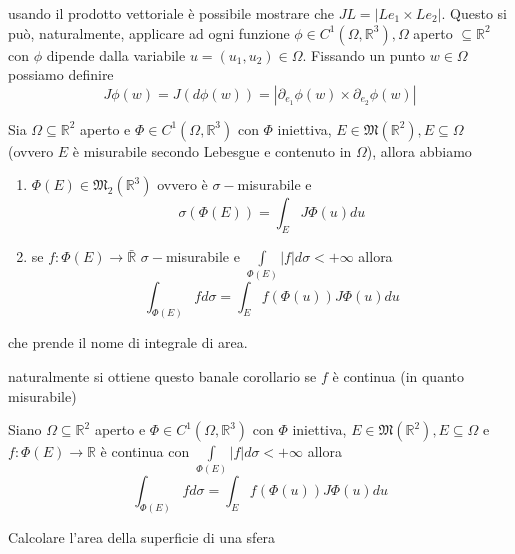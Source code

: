 usando il prodotto vettoriale è possibile mostrare che $JL = |Le_1 \times Le_2|$. Questo si può, naturalmente, applicare ad ogni funzione $\phi \in C^1(\Omega, \mathbb{R}^3), \Omega$ aperto $\subseteq \mathbb{R}^2$ con $\phi$ dipende dalla variabile $u = (u_1, u_2) \in \Omega$. Fissando un punto $w \in \Omega$ possiamo definire
$$
J\phi(w) = J(d\phi(w)) = |\partial_{e_1} \phi(w) \times \partial_{e_2} \phi(w)|
$$
\begin{theorem}[H2]
	Sia $\Omega \subseteq \mathbb{R}^2$ aperto e $\Phi \in C^1(\Omega, \mathbb{R}^3)$ con $\Phi$ iniettiva, $E \in \mathfrak{M}(\mathbb{R}^2), E \subseteq \Omega$ (ovvero $E$ è misurabile secondo Lebesgue e contenuto in $\Omega$), allora abbiamo
	\begin{enumerate}[label=\protect\circled{\arabic*}]
		\item $\Phi(E) \in \mathfrak{M}_2(\mathbb{R}^3)$ ovvero è $\sigma-$misurabile e 
		$$
		\sigma(\Phi(E)) = \int_E J\Phi(u)du
		$$
		\item se $f: \Phi(E) \to \bar{\mathbb{R}}$ $\sigma-$misurabile e $\int\limits_{\Phi(E)} |f|d\sigma < +\infty$ allora
		$$
			\int_{\Phi(E)} fd\sigma = \int_E f(\Phi(u))J\Phi(u)du
		$$
	\end{enumerate}
	che prende il nome di integrale di area.
\end{theorem}
naturalmente si ottiene questo banale corollario se $f$ è continua (in quanto misurabile)
\begin{cor}
	Siano $\Omega \subseteq \mathbb{R}^2$ aperto e $\Phi \in C^1(\Omega, \mathbb{R}^3)$ con $\Phi$ iniettiva, $E \in \mathfrak{M}(\mathbb{R}^2), E \subseteq \Omega$ e $f: \Phi(E) \to \mathbb{R}$ è continua con
	$\int\limits_{\Phi(E)} |f|d\sigma < +\infty$ allora
	$$
	\int_{\Phi(E)} f d\sigma = \int_E f(\Phi(u)) J\Phi(u)du
	$$
\end{cor}
\begin{example}
	Calcolare l'area della superficie di una sfera
\end{example}
